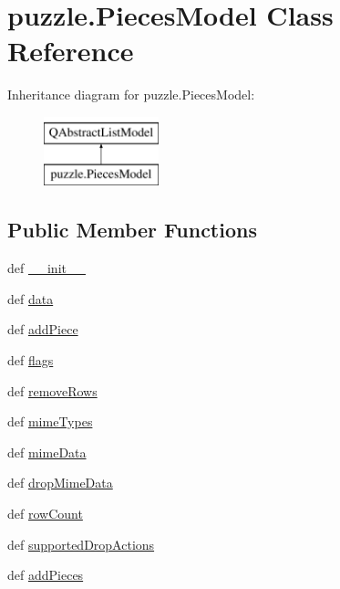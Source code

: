\hypertarget{classpuzzle_1_1PiecesModel}{}\section{puzzle.\+Pieces\+Model Class Reference}
\label{classpuzzle_1_1PiecesModel}
Inheritance diagram for puzzle.\+Pieces\+Model\+:\begin{figure}[H]
\begin{center}
\leavevmode
\includegraphics[height=2.000000cm]{classpuzzle_1_1PiecesModel}
\end{center}
\end{figure}
\subsection*{Public Member Functions}
\begin{DoxyCompactItemize}
\item 
def \hyperlink{classpuzzle_1_1PiecesModel_af352f95cd6b9ec611fa610702c43d2eb}{\+\_\+\+\_\+init\+\_\+\+\_\+}
\item 
def \hyperlink{classpuzzle_1_1PiecesModel_af30e660a158b3c0a3ae962fc4c641e9c}{data}
\item 
def \hyperlink{classpuzzle_1_1PiecesModel_ab5cfb37682286810b5676593b708b45c}{add\+Piece}
\item 
def \hyperlink{classpuzzle_1_1PiecesModel_a5eb172989023231141b00ff8931e5d9d}{flags}
\item 
def \hyperlink{classpuzzle_1_1PiecesModel_a025627019bedf7f163791595649d0909}{remove\+Rows}
\item 
def \hyperlink{classpuzzle_1_1PiecesModel_a8acd0d6b4d3bb01ce2772e75be779d4c}{mime\+Types}
\item 
def \hyperlink{classpuzzle_1_1PiecesModel_a3b94e2c89a3b32bed8d634885eb398d1}{mime\+Data}
\item 
def \hyperlink{classpuzzle_1_1PiecesModel_a87eb3174d83442b464d4538edef4d45c}{drop\+Mime\+Data}
\item 
def \hyperlink{classpuzzle_1_1PiecesModel_a50b71f030f7fe595c7caeb76f8bc2c51}{row\+Count}
\item 
def \hyperlink{classpuzzle_1_1PiecesModel_a74c8030741e8b610c6d3fb12eacf0828}{supported\+Drop\+Actions}
\item 
def \hyperlink{classpuzzle_1_1PiecesModel_a41e76264b1dccd86dc4f325b47303f8d}{add\+Pieces}
\end{DoxyCompactItemize}
